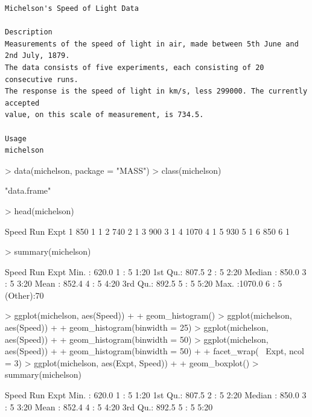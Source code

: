 \documentclass[12pt,letterpaper,final]{article}
\begin{document}
\begin{verbatim}
Michelson's Speed of Light Data

Description
Measurements of the speed of light in air, made between 5th June and 2nd July, 1879. 
The data consists of five experiments, each consisting of 20 consecutive runs. 
The response is the speed of light in km/s, less 299000. The currently accepted 
value, on this scale of measurement, is 734.5.

Usage
michelson
\end{verbatim}

\begin{Schunk}
\begin{Sinput}
> data(michelson, package = "MASS")
> class(michelson)
\end{Sinput}
\begin{Soutput}
[1] "data.frame"
\end{Soutput}
\begin{Sinput}
> head(michelson)
\end{Sinput}
\begin{Soutput}
  Speed Run Expt
1   850   1    1
2   740   2    1
3   900   3    1
4  1070   4    1
5   930   5    1
6   850   6    1
\end{Soutput}
\begin{Sinput}
> summary(michelson)
\end{Sinput}
\begin{Soutput}
     Speed             Run     Expt  
 Min.   : 620.0   1      : 5   1:20  
 1st Qu.: 807.5   2      : 5   2:20  
 Median : 850.0   3      : 5   3:20  
 Mean   : 852.4   4      : 5   4:20  
 3rd Qu.: 892.5   5      : 5   5:20  
 Max.   :1070.0   6      : 5         
                  (Other):70         
\end{Soutput}
\begin{Sinput}
> ggplot(michelson, aes(Speed)) + 
+   geom_histogram()
> ggplot(michelson, aes(Speed)) + 
+   geom_histogram(binwidth = 25)
> ggplot(michelson, aes(Speed)) + 
+   geom_histogram(binwidth = 50)
> ggplot(michelson, aes(Speed)) + 
+   geom_histogram(binwidth = 50) +
+   facet_wrap(~ Expt, ncol = 3)
> ggplot(michelson, aes(Expt, Speed)) +
+   geom_boxplot()
> summary(michelson)
\end{Sinput}
\begin{Soutput}
     Speed             Run     Expt  
 Min.   : 620.0   1      : 5   1:20  
 1st Qu.: 807.5   2      : 5   2:20  
 Median : 850.0   3      : 5   3:20  
 Mean   : 852.4   4      : 5   4:20  
 3rd Qu.: 892.5   5      : 5   5:20  

\end{Soutput}
\end{Schunk}
\end{document}

